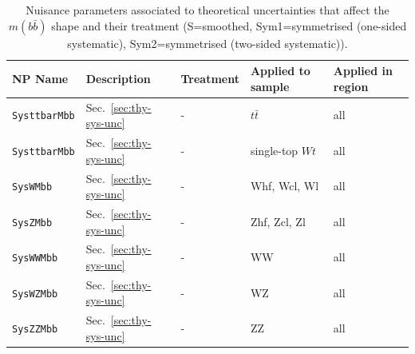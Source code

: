\begin{table}[ht]
    \centering
    \scriptsize
    \begin{tabular}{|p{3.5cm}|p{2.5cm}|p{1.5cm}|p{2cm}|p{1.5cm}|}
        \hline
        NP Name & Description & Treatment & Applied to sample & Applied in region \\
        \hline
        \texttt{SysttbarMbb} & Sec.~\ref{sec:thy-sys-unc} & - & $t\bar{t}$ & all \\
        \texttt{SysttbarMbb} & Sec.~\ref{sec:thy-sys-unc} & - & single-top $Wt$ & all \\
        \texttt{SysWMbb} & Sec.~\ref{sec:thy-sys-unc} & - & Whf, Wcl, Wl & all \\
        \texttt{SysZMbb} & Sec.~\ref{sec:thy-sys-unc} & - & Zhf, Zcl, Zl & all \\
        \texttt{SysWWMbb} & Sec.~\ref{sec:thy-sys-unc} & - & WW & all \\
        \texttt{SysWZMbb} & Sec.~\ref{sec:thy-sys-unc} & - & WZ & all \\
        \texttt{SysZZMbb} & Sec.~\ref{sec:thy-sys-unc} & - & ZZ & all \\
        \hline
    \end{tabular}
    \caption{Nuisance parameters associated to theoretical uncertainties that affect the $m(b\bar{b})$ shape and their treatment (S=smoothed, Sym1=symmetrised (one-sided systematic), Sym2=symmetrised (two-sided systematic)).}
    \label{tab:np-shape1}
\end{table}

